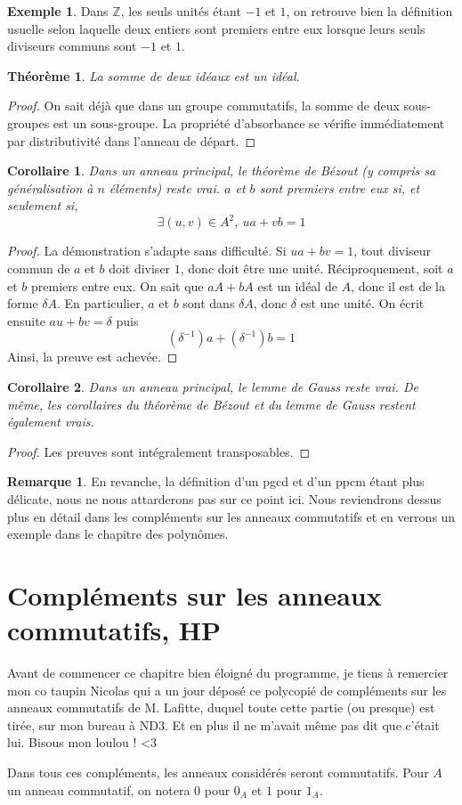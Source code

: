 \documentclass[french]{book}
\newcommand{\Z}{\mathbb{Z}}
\newcommand{\inv}{^{-1}}
\theoremstyle{plain}
\newtheorem{thm}{Théorème}[chapter]
\newtheorem{cor}{Corollaire}[chapter]
\theoremstyle{definition}
\newtheorem{exa}{Exemple}[chapter]
\newtheorem{rmq}{Remarque}[chapter]
\theoremstyle{remark}
\begin{document}
\begin{exa}
	Dans $\Z$, les seuls unités étant $-1$ et $1$, on retrouve bien la définition usuelle selon laquelle deux entiers sont premiers entre eux lorsque leurs seuls diviseurs communs sont $-1$ et $1$.
\end{exa}
\begin{thm}
	La somme de deux idéaux est un idéal.
\end{thm}
\begin{proof}
	On sait déjà que dans un groupe commutatifs, la somme de deux sous-groupes est un sous-groupe. La propriété d'absorbance se vérifie immédiatement par distributivité dans l'anneau de départ.
\end{proof}
\begin{cor}
	Dans un anneau principal, le théorème de Bézout (y compris sa généralisation à $n$ éléments) reste vrai. $a$ et $b$ sont premiers entre eux si, et seulement si, $$\exists(u,v)\in A^2,\ ua+vb=1$$
\end{cor}
\begin{proof}
	La démonstration s'adapte sans difficulté. Si $ua+bv=1$, tout diviseur commun de $a$ et $b$ doit diviser $1$, donc doit être une unité. Réciproquement, soit $a$ et $b$ premiers entre eux. On sait que $aA+bA$ est un idéal de $A$, donc il est de la forme $\delta A$. En particulier, $a$ et $b$ sont dans $\delta A$, donc $\delta$ est une unité. On écrit ensuite $au+bv=\delta$ puis $$(\delta\inv)a+(\delta\inv)b=1$$ Ainsi, la preuve est achevée.
\end{proof}
\begin{cor}
	Dans un anneau principal, le lemme de Gauss reste vrai. De même, les corollaires du théorème de Bézout et du lemme de Gauss restent également vrais.
\end{cor}
\begin{proof}
	Les preuves sont intégralement transposables.
\end{proof}
\begin{rmq}
	En revanche, la définition d'un pgcd et d'un ppcm étant plus délicate, nous ne nous attarderons pas sur ce point ici. Nous reviendrons dessus plus en détail dans les compléments sur les anneaux commutatifs et en verrons un exemple dans le chapitre des polynômes.
\end{rmq}
\chapter{Compléments sur les anneaux commutatifs, HP}
Avant de commencer ce chapitre bien éloigné du programme, je tiens à remercier mon co taupin Nicolas qui a un jour déposé ce polycopié de compléments sur les anneaux commutatifs de M. Lafitte, duquel toute cette partie (ou presque) est tirée, sur mon bureau à ND3. Et en plus il ne m'avait même pas dit que c'était lui. Bisous mon loulou ! <3 \\ \par Dans tous ces compléments, les anneaux considérés seront commutatifs. Pour $A$ un anneau commutatif, on notera $0$ pour $0_A$ et $1$ pour $1_A$.
\end{document}
